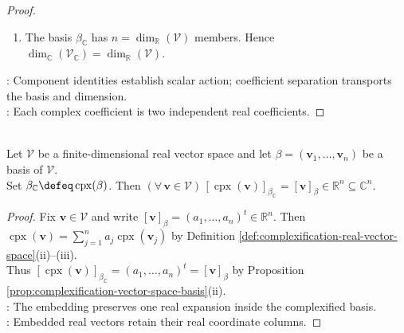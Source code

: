 \begin{proposition}
\begin{proof}
\begin{enumerate}[label=(\roman*)]
Thus $(\forall\,j\in\{1,\ldots,n\})\,c_j=d_j=0$ by independence of $\beta$, and $\beta_{\mathbb{C}}$ is a complex basis.
\item The basis $\beta_{\mathbb{C}}$ has $n=\dim_{\mathbb{R}}(\mathcal{V})$ members. Hence $\dim_{\mathbb{C}}(\mathcal{V}_{\mathbb{C}})=\dim_{\mathbb{R}}(\mathcal{V})$.
\end{enumerate}
: Component identities establish scalar action; coefficient separation transports the basis and dimension.\\
: Each complex coefficient is two independent real coefficients.
\end{proof}
\end{proposition}

\begin{corollary} \label{cor:complexification-coordinate-compatibility} \\
Let $\mathcal{V}$ be a finite-dimensional real vector space and let $\beta=(\mathbf{v}_1,\ldots,\mathbf{v}_n)$ be a basis of $\mathcal{V}$.\\
Set $\beta_{\mathbb{C}}\defeq\operatorname{cpx}(\beta)$. Then $(\forall\,\mathbf{v}\in\mathcal{V})\,[\operatorname{cpx}(\mathbf{v})]_{\beta_{\mathbb{C}}}=[\mathbf{v}]_{\beta}\in\mathbb{R}^n\subseteq\mathbb{C}^n$.
\begin{proof}
Fix $\mathbf{v}\in\mathcal{V}$ and write $[\mathbf{v}]_{\beta}=(a_1,\ldots,a_n)^t\in\mathbb{R}^n$. Then $\operatorname{cpx}(\mathbf{v})=\sum\limits_{j=1}^{n}a_j\operatorname{cpx}(\mathbf{v}_j)$ by Definition \ref{def:complexification-real-vector-space}(ii)--(iii).\\
Thus $[\operatorname{cpx}(\mathbf{v})]_{\beta_{\mathbb{C}}}=(a_1,\ldots,a_n)^t=[\mathbf{v}]_{\beta}$ by Proposition \ref{prop:complexification-vector-space-basis}(ii).\\
: The embedding preserves one real expansion inside the complexified basis.\\
: Embedded real vectors retain their real coordinate columns.
\end{proof}
\end{corollary}

